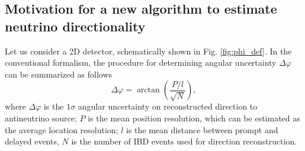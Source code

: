 \documentclass[tightenlines,twocolumn,prl,notitlepage,nofootinbib,preprintnumbers,longbibliography]{revtex4-1}
\begin{document}
\subsection{Motivation for a new algorithm to estimate neutrino directionality}

Let us consider a 2D detector, schematically shown in Fig. \ref{fig:phi_def}. In the conventional formalism, the procedure for determining angular uncertainty $\Delta\varphi$ can be summarized as follows \cite{Duvall_2022}
\begin{equation}
      \Delta \varphi = \arctan \left( \frac{P/l}{\sqrt N} \right),
      \label{eq:deltaphi}
\end{equation}
where $\Delta\varphi$ is the $1\sigma$ angular uncertainty on reconstructed direction to antineutrino source;
$P$ is the mean position resolution, which can be estimated as the average location resolution;
$l$ is the mean distance between prompt and delayed events, 
$N$ is the number of IBD events used for direction reconstruction.
\end{document}
